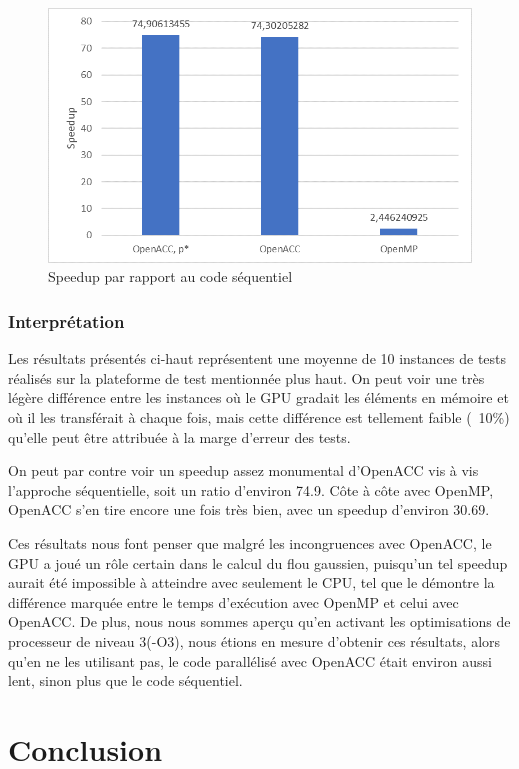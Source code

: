 \documentclass[11pt]{report}
\begin{document}
		\bigskip
		\begin{figure}[H]
			\centering
			\includegraphics[scale=0.8]{Images/graph_speedup.png}
			\caption{Speedup par rapport au code séquentiel}
		\end{figure}
		
		\subsection{Interprétation}
			Les résultats présentés ci-haut représentent une moyenne de 10 instances de tests réalisés sur la plateforme de test mentionnée plus haut. On peut voir une très légère différence entre les instances où le GPU gradait les éléments en mémoire et où il les transférait à chaque fois, mais cette différence est tellement faible (~10\%) qu'elle peut être attribuée à la marge d'erreur des tests.

			On peut par contre voir un speedup assez monumental d'OpenACC vis à vis l'approche séquentielle, soit un ratio d'environ 74.9. Côte à côte avec OpenMP, OpenACC s'en tire encore une fois très bien, avec un speedup d'environ 30.69.

			Ces résultats nous font penser que malgré les incongruences avec OpenACC, le GPU a joué un rôle certain dans le calcul du flou gaussien, puisqu'un tel speedup aurait été impossible à atteindre avec seulement le CPU, tel que le démontre la différence marquée entre le temps d'exécution avec OpenMP et celui avec OpenACC. De plus, nous nous sommes aperçu qu'en activant les optimisations de processeur de niveau 3(-O3), nous étions en mesure d'obtenir ces résultats, alors qu'en ne les utilisant pas, le code parallélisé avec OpenACC était environ aussi lent, sinon plus que le code séquentiel.
			

\chapter{Conclusion}
\end{document}
